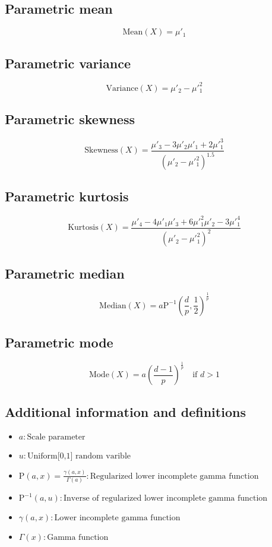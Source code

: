 \documentclass{article}
\begin{document}
\subsection{Parametric mean}
\begin{equation*} \mathrm{Mean}(X)=\mu'_{1} \end{equation*}
\subsection{Parametric variance}
\begin{equation*} \mathrm{Variance}(X)=\mu'_{2}-\mu'^{2}_{1} \end{equation*}
\subsection{Parametric skewness}
\begin{equation*} \mathrm{Skewness}(X)=\frac{\mu'_{3}-3\mu'_{2}\mu'_{1}+2\mu'^{3}_{1}}{(\mu'_{2}-\mu'^{2}_{1})^{1.5}} \end{equation*}
\subsection{Parametric kurtosis}
\begin{equation*} \mathrm{Kurtosis}(X)=\frac{\mu'_{4}-4\mu'_{1}\mu'_{3}+6\mu'^{2}_{1}\mu'_{2}-3\mu'^{4}_{1}}{(\mu'_{2}-\mu'^{2}_{1})^{2}} \end{equation*}
\subsection{Parametric median}
\begin{equation*} \mathrm{Median}(X)=a\text{P}^{-1}\left(\frac{d}{p},\frac{1}{2}\right)^{\frac{1}{p}} \end{equation*}
\subsection{Parametric mode}
\begin{equation*} \mathrm{Mode}(X)=a\left(\frac{d-1}{p}\right)^{\frac{1}{p}} \quad \text{if } d>1 \end{equation*}
\subsection{Additional information and definitions}
\begin{itemize}
    \item $ a:\text{Scale parameter} $
    \item $ u:\text{Uniform[0,1] random varible} $
    \item $ \text{P}\left(a,x\right)=\frac{\gamma(a,x)}{\Gamma(a)}:\text{Regularized lower incomplete gamma function} $
    \item $ \text{P}^{-1}\left(a,u\right):\text{Inverse of regularized lower incomplete gamma function} $
    \item $ \gamma\left(a,x\right):\text{Lower incomplete gamma function} $
    \item $ \Gamma\left(x\right):\text{Gamma function} $
\end{itemize}
\end{document}
